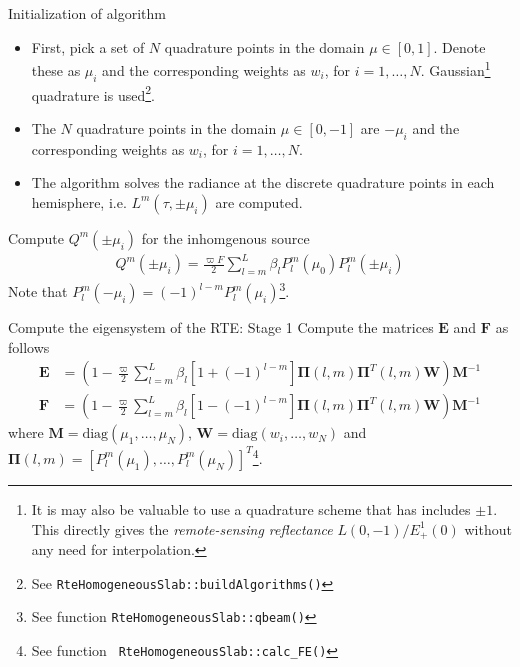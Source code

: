 \documentclass[14]{beamer}
\newcommand{\mvec}[1]{\mathbf{#1}}
\newcommand{\gvec}[1]{\boldsymbol{#1}}
\begin{document}
\begin{frame}{Initialization of algorithm}
  \begin{itemize}
  \item First, pick a set of $N$ quadrature points in the domain $\mu
    \in[0,1]$. Denote these as $\mu_i$ and the corresponding weights
    as $w_i$, for $i=1,\ldots,N$. Gaussian\footnote{It is may also be
      valuable to use a quadrature scheme that has includes $\pm
      1$. This directly gives the \emph{remote-sensing reflectance}
      $L(0,-1)/E_+^1(0)$ without any need for interpolation.}
    quadrature is used\footnote{See {\tt RteHomogeneousSlab::buildAlgorithms()}}.
  \item The $N$ quadrature points in the domain $\mu \in[0,-1]$ are
    $-\mu_i$ and the corresponding weights as $w_i$, for
    $i=1,\ldots,N$.
  \item The algorithm solves the radiance at the discrete quadrature
    points in each hemisphere, i.e. $L^m(\tau,\pm \mu_i)$ are
    computed.
  \end{itemize}
  
\end{frame}

\begin{frame}{Compute $Q^m(\pm \mu_i)$ for the inhomgenous source}
  \begin{align}
    Q^m(\pm \mu_i) = \frac{\varpi F}{2}
    \sum_{l=m}^L \beta_l P^m_l(\mu_0) P_l^m(\pm \mu_i)
  \end{align}
  Note that $P_l^m(-\mu_i) = (-1)^{l-m}P_l^m(\mu_i)$\footnote{See
    function {\tt RteHomogeneousSlab::qbeam()}}.
\end{frame}

\begin{frame}{Compute the eigensystem of the RTE: Stage 1}
  Compute the matrices $\mvec{E}$ and $\mvec{F}$ as follows
  \begin{align}
    \mvec{E} &= \left(
      1-\frac{\varpi}{2}\sum_{l=m}^L
    \beta_l
    \left[1+(-1)^{l-m}\right] 
    \gvec{\Pi}(l,m) \gvec{\Pi}^T(l,m) \mvec{W}
    \right)
    \mvec{M}^{-1}
  \end{align}
  \begin{align}
    \mvec{F} &= \left(
      1-\frac{\varpi}{2}\sum_{l=m}^L
    \beta_l
    \left[1-(-1)^{l-m}\right] 
    \gvec{\Pi}(l,m) \gvec{\Pi}^T(l,m) \mvec{W}
    \right)
    \mvec{M}^{-1}
  \end{align}
  where $\mvec{M} = \textrm{diag}(\mu_1,\ldots,\mu_N)$, $\mvec{W} =
  \textrm{diag}(w_i,\ldots,w_N)$ and $\gvec{\Pi}(l,m) =
  [P_l^m(\mu_1),\ldots,P_l^m(\mu_N)]^T$\footnote{See function {\tt
      RteHomogeneousSlab::calc\_FE()}}.
\end{frame}
\end{document}
